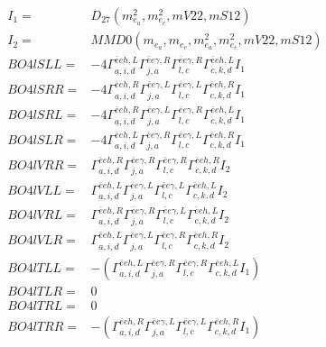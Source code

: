 \documentclass[A4,landscape]{article}
\begin{document}
\begin{align} 
I_1 = & D_{27}(m^2_{e_{{a}}}, m^2_{e_{{c}}}, mV22, mS12) \\ 
I_2 = & MMD0(m_{e_{{a}}}, m_{e_{{c}}}, m^2_{e_{{a}}}, m^2_{e_{{c}}}, mV22, mS12) \\ 
  BO4lSLL= & -4  \Gamma^{\bar{e}e h ,L}_{a, i, d} \Gamma^{\bar{e}e \gamma ,R}_{j, a} \Gamma^{\bar{e}e \gamma ,R}_{l, c} \Gamma^{\bar{e}e h ,L}_{c, k, d} I_1 \\ 
  BO4lSRR= & -4  \Gamma^{\bar{e}e h ,R}_{a, i, d} \Gamma^{\bar{e}e \gamma ,L}_{j, a} \Gamma^{\bar{e}e \gamma ,L}_{l, c} \Gamma^{\bar{e}e h ,R}_{c, k, d} I_1 \\ 
  BO4lSRL= & -4  \Gamma^{\bar{e}e h ,R}_{a, i, d} \Gamma^{\bar{e}e \gamma ,L}_{j, a} \Gamma^{\bar{e}e \gamma ,R}_{l, c} \Gamma^{\bar{e}e h ,L}_{c, k, d} I_1 \\ 
  BO4lSLR= & -4  \Gamma^{\bar{e}e h ,L}_{a, i, d} \Gamma^{\bar{e}e \gamma ,R}_{j, a} \Gamma^{\bar{e}e \gamma ,L}_{l, c} \Gamma^{\bar{e}e h ,R}_{c, k, d} I_1 \\ 
  BO4lVRR= &  \Gamma^{\bar{e}e h ,R}_{a, i, d} \Gamma^{\bar{e}e \gamma ,R}_{j, a} \Gamma^{\bar{e}e \gamma ,R}_{l, c} \Gamma^{\bar{e}e h ,R}_{c, k, d} I_2 \\ 
  BO4lVLL= &  \Gamma^{\bar{e}e h ,L}_{a, i, d} \Gamma^{\bar{e}e \gamma ,L}_{j, a} \Gamma^{\bar{e}e \gamma ,L}_{l, c} \Gamma^{\bar{e}e h ,L}_{c, k, d} I_2 \\ 
  BO4lVRL= &  \Gamma^{\bar{e}e h ,R}_{a, i, d} \Gamma^{\bar{e}e \gamma ,R}_{j, a} \Gamma^{\bar{e}e \gamma ,L}_{l, c} \Gamma^{\bar{e}e h ,L}_{c, k, d} I_2 \\ 
  BO4lVLR= &  \Gamma^{\bar{e}e h ,L}_{a, i, d} \Gamma^{\bar{e}e \gamma ,L}_{j, a} \Gamma^{\bar{e}e \gamma ,R}_{l, c} \Gamma^{\bar{e}e h ,R}_{c, k, d} I_2 \\ 
  BO4lTLL= & -( \Gamma^{\bar{e}e h ,L}_{a, i, d} \Gamma^{\bar{e}e \gamma ,R}_{j, a} \Gamma^{\bar{e}e \gamma ,R}_{l, c} \Gamma^{\bar{e}e h ,L}_{c, k, d} I_1) \\ 
  BO4lTLR= & 0 \\ 
  BO4lTRL= & 0 \\ 
  BO4lTRR= & -( \Gamma^{\bar{e}e h ,R}_{a, i, d} \Gamma^{\bar{e}e \gamma ,L}_{j, a} \Gamma^{\bar{e}e \gamma ,L}_{l, c} \Gamma^{\bar{e}e h ,R}_{c, k, d} I_1) \\ 
\end{align} 
\end{document}
